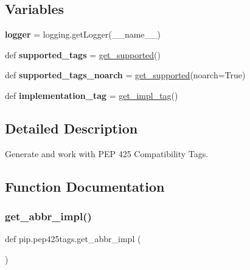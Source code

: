 \subsection*{Variables}
\begin{DoxyCompactItemize}
\item 
\mbox{\label{namespacepip_1_1pep425tags_ad3131899e4e86309def1e3004912ae51}} 
{\bfseries logger} = logging.\+get\+Logger(\+\_\+\+\_\+name\+\_\+\+\_\+)
\item 
\mbox{\label{namespacepip_1_1pep425tags_a0f70be92e1b7842af9f6ee790f10c170}} 
def {\bfseries supported\+\_\+tags} = \hyperlink{namespacepip_1_1pep425tags_a4a5b16312b8aa61715a75c4b60b2f1b7}{get\+\_\+supported}()
\item 
\mbox{\label{namespacepip_1_1pep425tags_a032e5a04768df97299781f547081f375}} 
def {\bfseries supported\+\_\+tags\+\_\+noarch} = \hyperlink{namespacepip_1_1pep425tags_a4a5b16312b8aa61715a75c4b60b2f1b7}{get\+\_\+supported}(noarch=True)
\item 
\mbox{\label{namespacepip_1_1pep425tags_ac39f34411a33b8f63383fc497dc5cc67}} 
def {\bfseries implementation\+\_\+tag} = \hyperlink{namespacepip_1_1pep425tags_ac3eee2c0d832af05428555a2da79e14c}{get\+\_\+impl\+\_\+tag}()
\end{DoxyCompactItemize}


\subsection{Detailed Description}
\begin{DoxyVerb}Generate and work with PEP 425 Compatibility Tags.\end{DoxyVerb}
 

\subsection{Function Documentation}
\mbox{\label{namespacepip_1_1pep425tags_a5728b64b870a5e696c67de254c167d62}} 
\subsubsection{\texorpdfstring{get\+\_\+abbr\+\_\+impl()}{get\_abbr\_impl()}}
{\footnotesize\ttfamily def pip.\+pep425tags.\+get\+\_\+abbr\+\_\+impl (\begin{DoxyParamCaption}{ }\end{DoxyParamCaption})}

